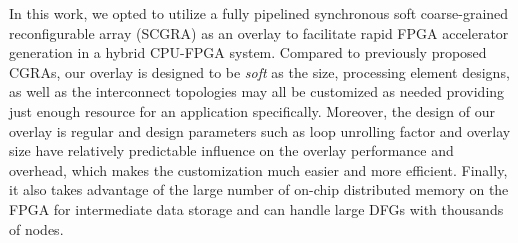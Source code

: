 In this work, we opted to utilize a fully pipelined synchronous soft coarse-grained reconfigurable
array (SCGRA) as an overlay to facilitate rapid FPGA accelerator generation in a hybrid CPU-FPGA
system. Compared to previously proposed CGRAs, our overlay is designed to be \emph{soft} as the size,
processing element designs, as well as the interconnect topologies may all be customized as needed
providing just enough resource for an application specifically. Moreover, the design of our overlay
is regular and design parameters such as loop unrolling factor and overlay size have
relatively predictable influence on the overlay performance and overhead, which makes the
customization much easier and more efficient. Finally, it also takes advantage of the large number
of on-chip distributed memory on the FPGA for intermediate data storage and can handle large DFGs
with thousands of nodes. 









